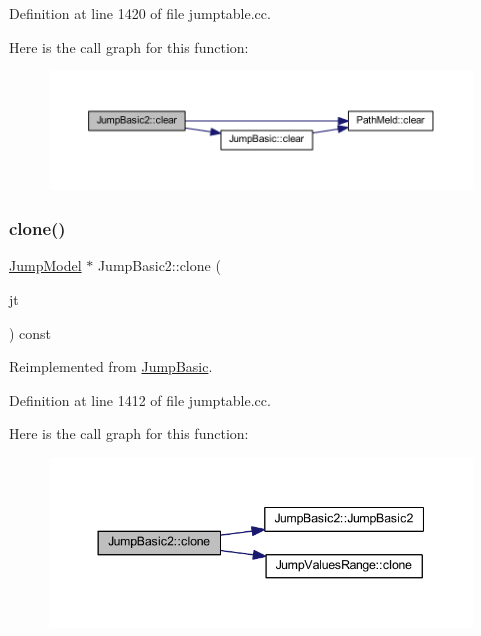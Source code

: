 Definition at line 1420 of file jumptable.\+cc.

Here is the call graph for this function\+:
\nopagebreak
\begin{figure}[H]
\begin{center}
\leavevmode
\includegraphics[width=350pt]{class_jump_basic2_a5eb65ff4a67499c48f720462d65f8152_cgraph}
\end{center}
\end{figure}
\mbox{\label{class_jump_basic2_a8d19ff3f441509f74402fdbefabb0801}} 
\subsubsection{\texorpdfstring{clone()}{clone()}}
{\footnotesize\ttfamily \mbox{\hyperlink{class_jump_model}{Jump\+Model}} $\ast$ Jump\+Basic2\+::clone (\begin{DoxyParamCaption}\item[{\mbox{\hyperlink{class_jump_table}{Jump\+Table}} $\ast$}]{jt }\end{DoxyParamCaption}) const\hspace{0.3cm}{\ttfamily [virtual]}}



Reimplemented from \mbox{\hyperlink{class_jump_basic_a3f79f34542045666ebfc491e83f2bc27}{Jump\+Basic}}.



Definition at line 1412 of file jumptable.\+cc.

Here is the call graph for this function\+:
\nopagebreak
\begin{figure}[H]
\begin{center}
\leavevmode
\includegraphics[width=344pt]{class_jump_basic2_a8d19ff3f441509f74402fdbefabb0801_cgraph}
\end{center}
\end{figure}
\mbox{\label{class_jump_basic2_ab5d1cebab5d2f98d0caf6fc551b29980}} 
